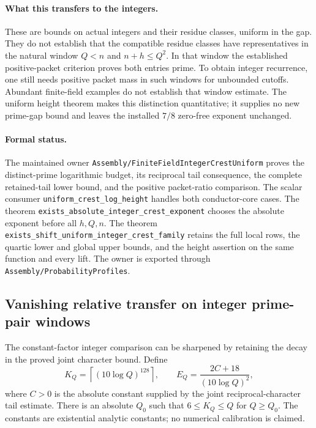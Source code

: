 \documentclass[11pt]{article}
\begin{document}
\paragraph{What this transfers to the integers.}
These are bounds on actual integers and their residue classes, uniform
in the gap. They do not establish that the compatible residue classes
have representatives in the natural window \(Q<n\) and \(n+h\leq Q^2\).
In that window the established positive-packet criterion proves both
entries prime. To obtain integer recurrence, one still needs positive
packet mass in such windows for unbounded cutoffs. Abundant finite-field
examples do not establish that window estimate.
The uniform height theorem makes this distinction quantitative;
it supplies no new prime-gap bound and leaves the installed \(7/8\)
zero-free exponent unchanged.

\paragraph{Formal status.}
The maintained owner
\texttt{Assembly/FiniteFieldIntegerCrestUniform}
proves the distinct-prime logarithmic budget, its reciprocal tail
consequence, the complete retained-tail lower bound, and the positive
packet-ratio comparison. The scalar consumer
\texttt{uniform\_crest\_log\_height}
handles both conductor-core cases.
The theorem
\texttt{exists\_absolute\_integer\_crest\_exponent}
chooses the absolute exponent before all \(h,Q,n\).
The theorem
\texttt{exists\_shift\_uniform\_integer\_crest\_family}
retains the full local rows, the quartic lower and global upper bounds,
and the height assertion on the same function and every lift.
The owner is exported through
\texttt{Assembly/ProbabilityProfiles}.

\subsection{Vanishing relative transfer on integer prime-pair windows}
The constant-factor integer comparison can be sharpened by retaining
the decay in the proved joint character bound. Define
\[
 K_Q=\left\lceil(10\log Q)^{128}\right\rceil,\qquad
 E_Q=\frac{2C+18}{(10\log Q)^2},
\]
where \(C>0\) is the absolute constant supplied by the joint
reciprocal-character tail estimate. There is an absolute \(Q_0\)
such that \(6\leq K_Q\leq Q\) for \(Q\geq Q_0\).
The constants are existential analytic constants; no numerical
calibration is claimed.
\end{document}
